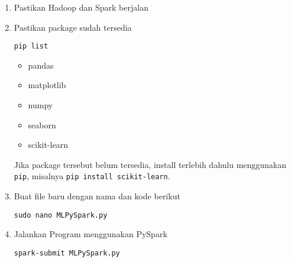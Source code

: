 \documentclass[a4paper]{tufte-handout}
\begin{document}
\begin{enumerate}
\item Pastikan Hadoop dan Spark berjalan
\item Pastikan package sudah tersedia
\begin{lstlisting}[language=Terminal]
 pip list
\end{lstlisting} 
\begin{multicols}{3}
\begin{itemize}
\item pandas
\item matplotlib
\item numpy
\item seaborn
\item scikit-learn
\end{itemize}
\end{multicols}

Jika package tersebut belum tersedia, install terlebih dahulu menggunakan {\tt pip}, misalnya {\tt pip install scikit-learn}.

\item Buat file baru dengan nama dan kode berikut
\begin{lstlisting}[language=Terminal]
 sudo nano MLPySpark.py
\end{lstlisting} 


\item Jalankan Program menggunakan PySpark
\begin{lstlisting}[language=Terminal]
 spark-submit MLPySpark.py
\end{lstlisting}

\end{enumerate}


\hrulefill

\clearpage
{}
\end{document}

